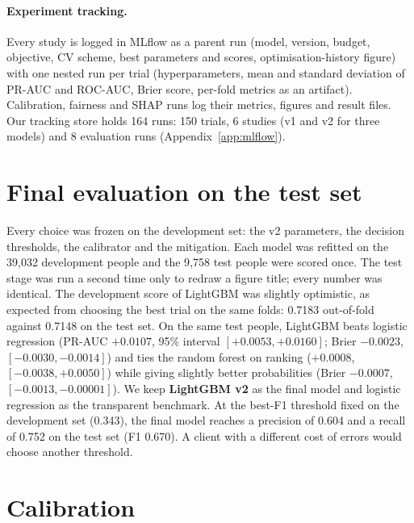 \documentclass[11pt,a4paper]{article}
\begin{document}
\paragraph{Experiment tracking.} Every study is logged in MLflow \cite{zaharia2018} as a parent run (model, version, budget, objective, CV scheme, best parameters and scores, optimisation-history figure) with one nested run per trial (hyperparameters, mean and standard deviation of PR-AUC and ROC-AUC, Brier score, per-fold metrics as an artifact). Calibration, fairness and SHAP runs log their metrics, figures and result files. Our tracking store holds 164 runs: 150 trials, 6 studies (v1 and v2 for three models) and 8 evaluation runs (Appendix~\ref{app:mlflow}).

\section{Final evaluation on the test set}
\label{sec:test}

Every choice was frozen on the development set: the v2 parameters, the decision thresholds, the calibrator and the mitigation. Each model was refitted on the 39{,}032 development people and the 9{,}758 test people were scored once. The test stage was run a second time only to redraw a figure title; every number was identical. The development score of LightGBM was slightly optimistic, as expected from choosing the best trial on the same folds: 0.7183 out-of-fold against 0.7148 on the test set. On the same test people, LightGBM beats logistic regression (PR-AUC $+0.0107$, 95\% interval $[+0.0053, +0.0160]$; Brier $-0.0023$, $[-0.0030, -0.0014]$) and ties the random forest on ranking ($+0.0008$, $[-0.0038, +0.0050]$) while giving slightly better probabilities (Brier $-0.0007$, $[-0.0013, -0.00001]$). We keep \textbf{LightGBM v2} as the final model and logistic regression as the transparent benchmark. At the best-F1 threshold fixed on the development set (0.343), the final model reaches a precision of 0.604 and a recall of 0.752 on the test set (F1 0.670). A client with a different cost of errors would choose another threshold.

\section{Calibration}
\label{sec:calib}
\end{document}

